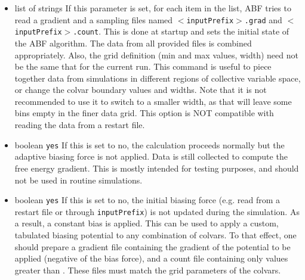 \begin{itemize}
\item %
  {list of strings}
  {If this parameter is set, for each item in the list, ABF tries to read
    a gradient and a sampling files named \texttt{$<$inputPrefix$>$.grad}
    and \texttt{$<$inputPrefix$>$.count}. This is done at
    startup and sets the initial state of the ABF algorithm.
    The data from all provided files is combined appropriately.
    Also, the grid definition (min and max values, width) need not be the same
    that for the current run. This command is useful to piece together
    data from simulations in different regions of collective variable space,
    or change the colvar boundary values and widths. Note that it is not
    recommended to use it to switch to a smaller width, as that will leave
    some bins empty in the finer data grid.
    This option is NOT compatible with reading the data from a restart file.}

\item {}
  {boolean}
  {\texttt{yes}}
  { If this is set to no, the calculation proceeds normally but the adaptive
    biasing force is not applied. Data is still collected to compute
    the free energy gradient. This is mostly intended for testing purposes, and should
    not be used in routine simulations.
  }

\item {}
  {boolean}
  {\texttt{yes}}
  { If this is set to no, the initial biasing force (e.g. read from a restart file or
    through \texttt{inputPrefix}) is not updated during the simulation.
    As a result, a constant bias is applied. This can be used to apply a custom, tabulated
    biasing potential to any combination of colvars. To that effect, one should prepare
    a gradient file containing the gradient of the potential to be applied (negative
    of the bias force), and a count file containing only values greater than
    . These files must match the grid parameters of the colvars.
  }
\end{itemize}

